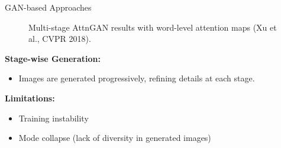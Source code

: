 \begin{frame}[allowframebreaks]{GAN-based Approaches}
\begin{figure}
        \caption*{Multi-stage AttnGAN results with word-level attention maps (Xu et al., CVPR 2018).}
    \end{figure}
\framebreak        
    \textbf{Stage-wise Generation:}
        \begin{itemize}
            \item Images are generated progressively, refining details at each stage.
        \end{itemize}
    \textbf{Limitations:}
        \begin{itemize}
            \item Training instability
            \item Mode collapse (lack of diversity in generated images)
        \end{itemize}
\end{frame}


